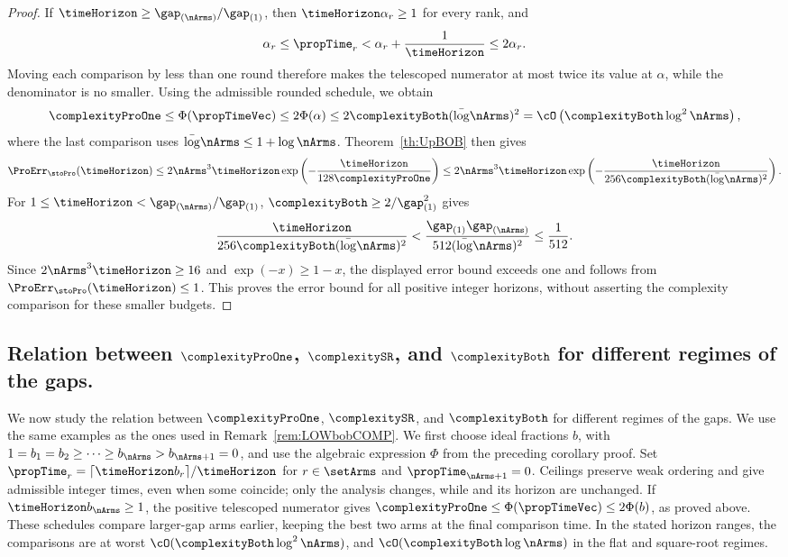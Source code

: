 \begin{proof}
If $\timeHorizon\geq\gap_{(\nArms)}/\gap_{(1)}$, then
$\timeHorizon\alpha_r\geq1$ for every rank, and
\[
\alpha_r\leq\propTime_r<\alpha_r+\frac{1}{\timeHorizon}\leq2\alpha_r.
\]
Moving each comparison by less than one round therefore makes the telescoped
numerator at most twice its value at $\alpha$, while the denominator is
no smaller. Using the admissible rounded schedule, we obtain
\[
\complexityProOne\leq\Phi(\propTimeVec)\leq2\Phi(\alpha)
\leq2\complexityBoth(\bar\log\nArms)^2
=\cO\left(\complexityBoth\log^2\nArms\right),
\]
where the last comparison uses $\bar\log\nArms\leq1+\log\nArms$.
Theorem~\ref{th:UpBOB} then gives
\[
\ProErr_{\stoPro}(\timeHorizon)
\leq2\nArms^3\timeHorizon\exp\left(-\frac{\timeHorizon}{128\complexityProOne}\right)
\leq2\nArms^3\timeHorizon\exp\left(
-\frac{\timeHorizon}{256\complexityBoth(\bar\log\nArms)^2}\right).
\]
For $1\leq\timeHorizon<\gap_{(\nArms)}/\gap_{(1)}$,
$\complexityBoth\geq2/\gap_{(1)}^2$ gives
\[
\frac{\timeHorizon}{256\complexityBoth(\bar\log\nArms)^2}
<\frac{\gap_{(1)}\gap_{(\nArms)}}{512(\bar\log\nArms)^2}\leq\frac{1}{512}.
\]
Since $2\nArms^3\timeHorizon\geq16$ and $\exp(-x)\geq1-x$, the displayed
error bound exceeds one and follows from $\ProErr_{\stoPro}(\timeHorizon)\leq1$.
This proves the error bound for all positive integer horizons, without
asserting the complexity comparison for these smaller budgets.
\end{proof}
%

\subsection{Relation between 
	$\complexityProOne$, $\complexitySR$, and 
	$\complexityBoth$ for different regimes of the 
	gaps.}
We now study the relation between 
$\complexityProOne$, $\complexitySR$, and 
$\complexityBoth$ for different regimes of the 
gaps.
We use the same examples as the ones used in 
Remark~\ref{rem:LOWbobCOMP}.
We first choose ideal fractions $b$,
with $1=b_1=b_2\geq\cdots\geq b_{\nArms}>b_{\nArms+1}=0$,
and use the algebraic expression $\Phi$ from the preceding corollary proof.
Set $\propTime_r=\lceil\timeHorizon b_r\rceil/\timeHorizon$ for $r\in\setArms$
and $\propTime_{\nArms+1}=0$. Ceilings preserve weak ordering and give
admissible integer times, even when some coincide; only the analysis
changes, while \Pone{} and its horizon are unchanged.
If $\timeHorizon b_{\nArms}\geq1$, the positive telescoped numerator gives
$\complexityProOne\leq\Phi(\propTimeVec)\leq2\Phi(b)$, as proved above.
These schedules compare larger-gap arms earlier, keeping the best two
arms at the final comparison time.
In the stated horizon ranges, the comparisons are at worst
$\cO(\complexityBoth\log^2\nArms)$, and
$\cO(\complexityBoth\log\nArms)$ in the flat and square-root regimes.

